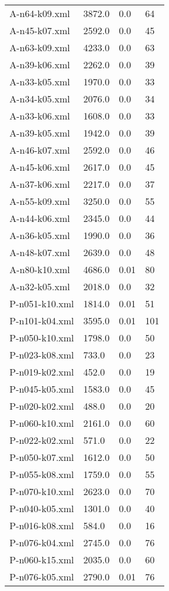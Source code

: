 \documentclass[12pt]{article}
\begin{document}
\begin{appendices}
\begin{table}[]
\begin{tabular}{llll}
	A-n64-k09.xml & 3872.0 & 0.0 & 64 \\
	A-n45-k07.xml & 2592.0 & 0.0 & 45 \\
	A-n63-k09.xml & 4233.0 & 0.0 & 63 \\
	A-n39-k06.xml & 2262.0 & 0.0 & 39 \\
	A-n33-k05.xml & 1970.0 & 0.0 & 33 \\
	A-n34-k05.xml & 2076.0 & 0.0 & 34 \\
	A-n33-k06.xml & 1608.0 & 0.0 & 33 \\
	A-n39-k05.xml & 1942.0 & 0.0 & 39 \\
	A-n46-k07.xml & 2592.0 & 0.0 & 46 \\
	A-n45-k06.xml & 2617.0 & 0.0 & 45 \\
	A-n37-k06.xml & 2217.0 & 0.0 & 37 \\
	A-n55-k09.xml & 3250.0 & 0.0 & 55 \\
	A-n44-k06.xml & 2345.0 & 0.0 & 44 \\
	A-n36-k05.xml & 1990.0 & 0.0 & 36 \\
	A-n48-k07.xml & 2639.0 & 0.0 & 48 \\
	A-n80-k10.xml & 4686.0 & 0.01 & 80 \\
	A-n32-k05.xml & 2018.0 & 0.0 & 32 \\
	P-n051-k10.xml & 1814.0 & 0.01 & 51 \\
	P-n101-k04.xml & 3595.0 & 0.01 & 101 \\
	P-n050-k10.xml & 1798.0 & 0.0 & 50 \\
	P-n023-k08.xml & 733.0 & 0.0 & 23 \\
	P-n019-k02.xml & 452.0 & 0.0 & 19 \\
	P-n045-k05.xml & 1583.0 & 0.0 & 45 \\
	P-n020-k02.xml & 488.0 & 0.0 & 20 \\
	P-n060-k10.xml & 2161.0 & 0.0 & 60 \\
	P-n022-k02.xml & 571.0 & 0.0 & 22 \\
	P-n050-k07.xml & 1612.0 & 0.0 & 50 \\
	P-n055-k08.xml & 1759.0 & 0.0 & 55 \\
	P-n070-k10.xml & 2623.0 & 0.0 & 70 \\
	P-n040-k05.xml & 1301.0 & 0.0 & 40 \\
	P-n016-k08.xml & 584.0 & 0.0 & 16 \\
	P-n076-k04.xml & 2745.0 & 0.0 & 76 \\
	P-n060-k15.xml & 2035.0 & 0.0 & 60 \\
	P-n076-k05.xml & 2790.0 & 0.01 & 76 \\

\end{tabular}
\end{table}
\end{appendices}
\end{document}
